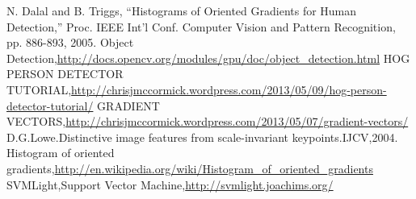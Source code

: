 \documentclass[10pt,technote,onecolumn,twoside]{IEEEtran}
\begin{document}
\begin{thebibliography}{99}
N. Dalal and B. Triggs, “Histograms of Oriented Gradients for
Human Detection,” Proc. IEEE Int’l Conf. Computer Vision and
Pattern Recognition, pp. 886-893, 2005.
Object Detection,\url{http://docs.opencv.org/modules/gpu/doc/object_detection.html}
HOG PERSON DETECTOR TUTORIAL,\url{http://chrisjmccormick.wordpress.com/2013/05/09/hog-person-detector-tutorial/}
GRADIENT VECTORS,\url{http://chrisjmccormick.wordpress.com/2013/05/07/gradient-vectors/}
D.G.Lowe.Distinctive image features from scale-invariant keypoints.IJCV,2004.
Histogram of oriented gradients,\url{http://en.wikipedia.org/wiki/Histogram_of_oriented_gradients}
SVMLight,Support Vector Machine,\url{http://svmlight.joachims.org/}
\end{thebibliography}
%
\end{document}
